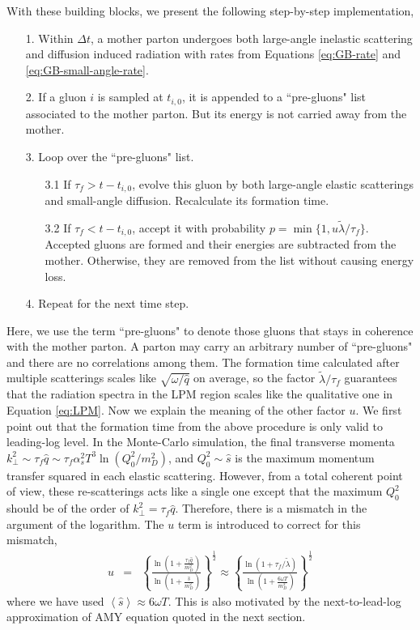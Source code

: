 \documentclass[aps, prc, reprint, amsmath, groupedaddress, nofootinbib]{revtex4-1}
\begin{document}
{With these building blocks, we present the following step-by-step implementation,
\begin{itemize}
\item[1.] Within $\Delta t$, a mother parton undergoes both large-angle inelastic scattering and diffusion induced radiation with rates from Equations \ref{eq:GB-rate} and \ref{eq:GB-small-angle-rate}.
\item[2.] If a gluon $i$ is sampled at $t_{i,0}$, it is appended to a ``pre-gluons" list associated to the mother parton. But its energy is not carried away from the mother.
\item[3.] Loop over the ``pre-gluons" list. 
\begin{itemize}
\item[3.1] If $\tau_f > t-t_{i,0}$, evolve this gluon by both large-angle elastic scatterings and small-angle diffusion. Recalculate its formation time.
\item[3.2] If $\tau_f < t-t_{i,0}$, accept it with probability $p = \min\{1, u\tilde{\lambda}/\tau_f\}$. Accepted gluons are formed and their energies are subtracted from the mother. Otherwise, they are removed from the list without causing energy loss.
\end{itemize} 
\item[4.] Repeat for the next time step.
\end{itemize}
Here, we use the term ``pre-gluons" to denote those gluons that stays in coherence with the mother parton.
A parton may carry an arbitrary number of ``pre-gluons" and there are no correlations among them.
The formation time calculated after multiple scatterings scales like $\sqrt{\omega/\hat{q}}$ on average, so the factor $\tilde{\lambda}/\tau_f$ guarantees that the radiation spectra in the LPM region scales like the qualitative one in Equation \ref{eq:LPM}.
Now we explain the meaning of the other factor $u$.
We first point out that the formation time from the above procedure is only valid to leading-log level.
In the Monte-Carlo simulation, the final transverse momenta $k_\perp^2\sim \tau_f \hat{q} \sim \tau_f \alpha_s^2 T^3 \ln(Q_0^2/m_D^2)$, 
and $Q_0^2\sim \hat{s}$ is the maximum momentum transfer squared in each elastic scattering.
However, from a total coherent point of view, these re-scatterings acts like a single one except that the maximum $Q_0^2$ should be of the order of $k_\perp^2 = \tau_f \hat{q}$.
Therefore, there is a mismatch in the argument of the logarithm.
The $u$ term is introduced to correct for this mismatch,
\begin{eqnarray}
u &=& \left\{\frac{\ln\left(1+\frac{\tau_f\hat{q}}{m_D^2}\right)}{\ln\left(1+\frac{\hat{s}}{m_D^2}\right)}\right\}^{\frac{1}{2}}
\approx \left\{\frac{\ln\left(1+\tau_f/\tilde{\lambda}\right)}{\ln\left(1+\frac{6\omega T}{m_D^2}\right)}\right\}^{\frac{1}{2}}
\end{eqnarray} 
where we have used $\left\langle\hat{s}\right\rangle \approx 6 \omega T$.
This is also motivated by the next-to-lead-log approximation of AMY equation quoted in the next section.

}
\end{document}

